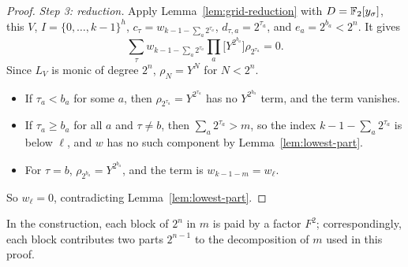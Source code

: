 \begin{proof}
\emph{Step 3: reduction.} Apply Lemma~\ref{lem:grid-reduction} with
\(D=\mathbb F_2[y_\sigma]\), this \(V\), \(I=\{0,\ldots,k-1\}^h\),
\(c_\tau=w_{k-1-\sum_a2^{\tau_a}}\), \(d_{\tau,a}=2^{\tau_a}\), and
\(e_a=2^{b_a}<2^n\). It gives
\[
 \sum_\tau w_{k-1-\sum_a2^{\tau_a}}\prod_a\bigl[Y^{2^{b_a}}\bigr]\rho_{2^{\tau_a}}=0 .
\]
Since \(L_V\) is monic of degree \(2^n\), \(\rho_N=Y^N\) for \(N<2^n\).
\begin{itemize}
 \item If \(\tau_a<b_a\) for some \(a\), then \(\rho_{2^{\tau_a}}=Y^{2^{\tau_a}}\) has
 no \(Y^{2^{b_a}}\) term, and the term vanishes.
 \item If \(\tau_a\ge b_a\) for all \(a\) and \(\tau\ne b\), then
 \(\sum_a2^{\tau_a}>m\), so the index \(k-1-\sum_a2^{\tau_a}\) is below \(\ell\), and
 \(w\) has no such component by Lemma~\ref{lem:lowest-part}.
 \item For \(\tau=b\), \(\rho_{2^{b_a}}=Y^{2^{b_a}}\), and the term is
 \(w_{k-1-m}=w_\ell\).
\end{itemize}
So \(w_\ell=0\), contradicting Lemma~\ref{lem:lowest-part}.
\end{proof}

In the construction, each block of \(2^n\) in \(m\) is paid by a factor \(F^2\);
correspondingly, each block contributes two parts \(2^{n-1}\) to the
decomposition of \(m\) used in this proof.

